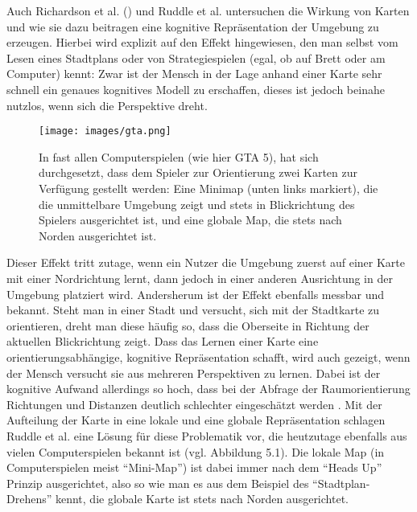 Auch Richardson et al. (\cite{Richardson1999}) und Ruddle et al. \cite{Ruddle1999TheEnvironments} untersuchen die Wirkung von Karten und wie sie dazu beitragen eine kognitive Repräsentation der Umgebung zu erzeugen.
Hierbei wird explizit auf den Effekt hingewiesen, den man selbst vom Lesen eines Stadtplans oder von Strategiespielen (egal, ob auf Brett oder am Computer) kennt: Zwar ist der Mensch in der Lage anhand einer Karte sehr schnell ein genaues kognitives Modell zu erschaffen, dieses ist jedoch beinahe nutzlos, wenn sich die Perspektive dreht.


\begin{figure}[h]
  \centering
  \texttt{[image: images/gta.png]}
  \caption{In fast allen Computerspielen (wie hier GTA 5), hat sich durchgesetzt, dass dem Spieler zur Orientierung zwei Karten zur Verfügung gestellt werden: Eine Minimap (unten links markiert), die die unmittelbare Umgebung zeigt und stets in Blickrichtung des Spielers ausgerichtet ist, und eine globale Map, die stets nach Norden ausgerichtet ist.}
  \label{fig:todo}
\end{figure}

Dieser Effekt tritt zutage, wenn ein Nutzer die Umgebung zuerst auf einer Karte mit einer Nordrichtung lernt, dann jedoch in einer anderen Ausrichtung in der Umgebung platziert wird. Andersherum ist der Effekt ebenfalls messbar und bekannt. Steht man in einer Stadt und versucht, sich mit der Stadtkarte zu orientieren, dreht man diese häufig so, dass die Oberseite in Richtung der aktuellen Blickrichtung zeigt. Dass das Lernen einer Karte eine orientierungsabhängige, kognitive Repräsentation schafft, wird auch gezeigt, wenn der Mensch versucht sie aus mehreren Perspektiven zu lernen. Dabei ist der kognitive Aufwand allerdings so hoch, dass bei der Abfrage der Raumorientierung Richtungen und Distanzen deutlich schlechter eingeschätzt werden \cite{Richardson1999}.
Mit der Aufteilung der Karte in eine lokale und eine globale Repräsentation schlagen Ruddle et al. \cite{Ruddle1999TheEnvironments} eine Lösung für diese Problematik vor, die heutzutage ebenfalls aus vielen Computerspielen bekannt ist (vgl. Abbildung 5.1). Die lokale Map (in Computerspielen meist “Mini-Map”) ist dabei immer nach dem “Heads Up” Prinzip ausgerichtet, also so wie man es aus dem Beispiel des “Stadtplan-Drehens” kennt, die globale Karte ist stets nach Norden ausgerichtet.

